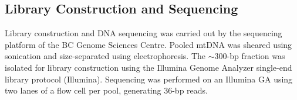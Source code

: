 \subsection{Library Construction and Sequencing}\label{var_detect.methods.library}
Library construction and DNA sequencing was carried out by the sequencing platform of the BC Genome Sciences Centre.  Pooled mtDNA was sheared using sonication and size-separated using electrophoresis. The $\sim300$-bp fraction was isolated for library construction using the Illumina Genome Analyzer single-end library protocol (Illumina). Sequencing was performed on an Illumina GA using two lanes of a flow cell per pool, generating 36-bp reads.

\begin{table}[htbp]
\begin{minipage}{\textwidth}
\caption{Summary of Illumina Sequence Mapping (Untrimmed Reads)}
\label{var.table.illumina.untrimmed}
\noindent{}
\end{minipage}
\end{table}
